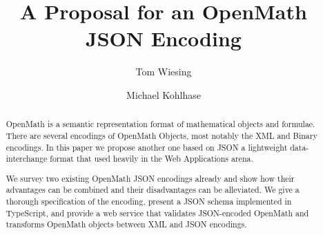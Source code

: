 \documentclass[12pt]{article}
\title{A Proposal for an OpenMath JSON Encoding}
\author{Tom Wiesing\and Michael Kohlhase}
\begin{document}
\maketitle

\begin{abstract}
  OpenMath is a semantic representation format of mathematical objects and formulae.
  There are several encodings of OpenMath Objects, most notably the XML and Binary
  encodings. In this paper we propose another one based on JSON a lightweight
  data-interchange format that used heavily in the Web Applications arena. 
  
  We survey two existing OpenMath JSON encodings already and show how their advantages can
  be combined and their disadvantages can be alleviated. We give a thorough specification
  of the encoding, present a JSON schema implemented in TypeScript, and provide a web
  service that validates JSON-encoded OpenMath and transforms OpenMath objects between XML
  and JSON encodings.
\end{abstract}
    
\newpage
\tableofcontents
\newpage





\printbibliography
\end{document}
